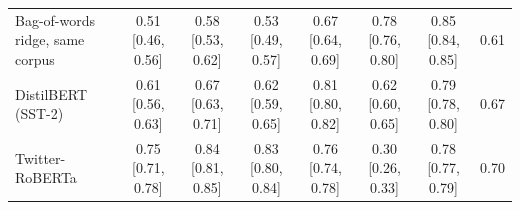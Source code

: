 \begin{tabular}{@{}lccccccc@{}}
Bag-of-words ridge, same corpus & 0.51 {\scriptsize[0.46, 0.56]} & 0.58 {\scriptsize[0.53, 0.62]} & 0.53 {\scriptsize[0.49, 0.57]} & 0.67 {\scriptsize[0.64, 0.69]} & 0.78 {\scriptsize[0.76, 0.80]} & 0.85 {\scriptsize[0.84, 0.85]} & 0.61 \\
DistilBERT (SST-2) & 0.61 {\scriptsize[0.56, 0.63]} & 0.67 {\scriptsize[0.63, 0.71]} & 0.62 {\scriptsize[0.59, 0.65]} & 0.81 {\scriptsize[0.80, 0.82]} & 0.62 {\scriptsize[0.60, 0.65]} & 0.79 {\scriptsize[0.78, 0.80]} & 0.67 \\
Twitter-RoBERTa & 0.75 {\scriptsize[0.71, 0.78]} & 0.84 {\scriptsize[0.81, 0.85]} & 0.83 {\scriptsize[0.80, 0.84]} & 0.76 {\scriptsize[0.74, 0.78]} & 0.30 {\scriptsize[0.26, 0.33]} & 0.78 {\scriptsize[0.77, 0.79]} & 0.70 \\
\bottomrule
\end{tabular}
